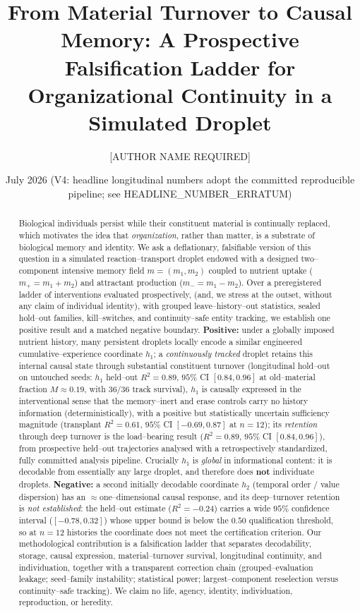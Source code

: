 \documentclass[11pt]{article}
\title{\textbf{From Material Turnover to Causal Memory: A Prospective Falsification Ladder for Organizational Continuity in a Simulated Droplet}}
\author[1]{[AUTHOR NAME REQUIRED]}
\affil[1]{[AFFILIATION REQUIRED] \quad ORCID: [ORCID IF AVAILABLE]}
\date{July 2026 \quad (V4: headline longitudinal numbers adopt the committed reproducible pipeline; see HEADLINE\_NUMBER\_ERRATUM)}
\begin{document}
\maketitle

\begin{abstract}
\noindent Biological individuals persist while their constituent material is continually replaced, which motivates
the idea that \emph{organization}, rather than matter, is a substrate of biological memory and identity. We ask a
deflationary, falsifiable version of this question in a simulated reaction--transport droplet endowed with a designed
two--component intensive memory field $m=(m_1,m_2)$ coupled to nutrient uptake ($m_+=m_1+m_2$) and attractant
production ($m_-=m_1-m_2$). Over a preregistered ladder of interventions evaluated prospectively, (and, we stress at the outset, without any claim of individual identity), with grouped
leave--history--out statistics, sealed hold--out families, kill--switches, and continuity--safe entity tracking, we
establish one positive result and a matched negative boundary. \textbf{Positive:} under a globally imposed nutrient
history, many persistent droplets locally encode a similar engineered cumulative--experience coordinate $h_1$; a
\emph{continuously tracked} droplet retains this internal causal state through substantial constituent turnover
(longitudinal hold--out on untouched seeds: $h_1$ held--out $R^2=0.89$, $95\%$ CI $[0.84,0.96]$ at old--material
fraction $M\approx0.19$, with $36/36$ track survival), $h_1$ is causally expressed in the interventional sense that the memory--inert and erase controls carry no history information (deterministically), with a positive but statistically uncertain sufficiency magnitude (transplant $R^2=0.61$, $95\%$ CI $[-0.69,0.87]$ at $n=12$); its \emph{retention} through deep turnover is the load--bearing result ($R^2=0.89$, $95\%$ CI $[0.84,0.96]$), from prospective held--out trajectories analysed with a retrospectively standardized, fully committed analysis pipeline.
Crucially $h_1$ is \emph{global} in informational content: it is decodable from essentially any large droplet, and
therefore does \textbf{not} individuate droplets. \textbf{Negative:} a second initially decodable coordinate $h_2$ (temporal order / value dispersion) has an $\approx$one--dimensional causal response, and its deep--turnover retention is \emph{not established}: the held--out estimate ($R^2=-0.24$) carries a wide $95\%$ confidence interval ($[-0.78,0.32]$) whose upper bound is below the $0.50$ qualification threshold, so at $n=12$ histories the coordinate does not meet the certification criterion. Our methodological contribution is a
falsification ladder that separates decodability, storage, causal expression, material--turnover survival,
longitudinal continuity, and individuation, together with a transparent correction chain (grouped--evaluation
leakage; seed--family instability; statistical power; largest--component reselection versus continuity--safe
tracking). We claim no life, agency, identity, individuation, reproduction, or heredity.
\end{abstract}
\end{document}
